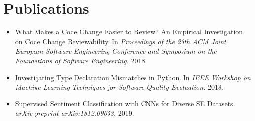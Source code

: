 \documentclass[]{Achyudh_Resume}
\begin{document}
\section{Publications}
\begin{itemize}
    \item[] What Makes a Code Change Easier to Review? An Empirical Investigation on Code Change Reviewability. In \textit{Proceedings of the 26th ACM Joint European Software Engineering Conference and Symposium on the Foundations of Software Engineering.} 2018.
    \item[] Investigating Type Declaration Mismatches in Python. In \textit{IEEE Workshop on Machine Learning Techniques for Software Quality Evaluation.} 2018.
    \item[] Supervised Sentiment Classification with CNNs for Diverse SE Datasets. \textit{arXiv preprint arXiv:1812.09653.} 2019.
\end{itemize}

% 
% 
\end{document}
